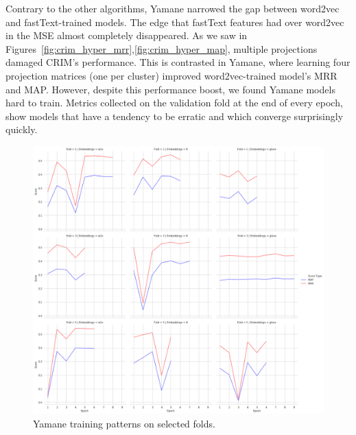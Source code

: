 Contrary to the other algorithms, Yamane narrowed the gap between word2vec and fastText-trained models.  The edge that fastText features had over word2vec in the \ac{MSE} almost completely disappeared.  As we saw in Figures~\ref{fig:crim_hyper_mrr},\ref{fig:crim_hyper_map}, multiple projections damaged CRIM's performance.  This is contrasted in Yamane, where learning four projection matrices (one per cluster) improved word2vec-trained model's \ac{MRR} and \ac{MAP}.  However, despite this performance boost, we found Yamane models hard to train.  Metrics collected on the validation fold at the end of every epoch, show models that have a tendency to be erratic and which converge surprisingly quickly.  
\begin{figure}[ht!] 
  \centering
  \includegraphics[width=.75\linewidth]{images/Yamane_training_patterns.png}
  \caption{Yamane training patterns on selected folds.}
  \label{fig:yamane_training_patterns}
\end{figure}
